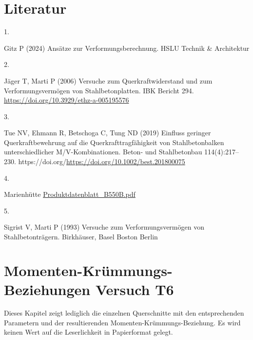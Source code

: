 \documentclass[
  11pt,
  letterpaper,
]{scrreprt}
\newlength{\cslhangindent}
\newlength{\csllabelwidth}
\newenvironment{CSLReferences}[2] %
 {\begin{list}{}{%
  \setlength{\itemindent}{0pt}
  \setlength{\leftmargin}{0pt}
  \setlength{\parsep}{0pt}
  \ifodd #1
   \setlength{\leftmargin}{\cslhangindent}
   \setlength{\itemindent}{-1\cslhangindent}
  \fi
  \setlength{\itemsep}{#2\baselineskip}}}
 {\end{list}}
\newcommand{\CSLLeftMargin}[1]{\parbox[t]{\csllabelwidth}{\strut#1\strut}}
\newcommand{\CSLRightInline}[1]{\parbox[t]{\linewidth - \csllabelwidth}{\strut#1\strut}}
\begin{document}
\chapter*{Literatur}\label{literatur}


\label{refs}
\begin{CSLReferences}{0}{1}
\CSLLeftMargin{1. }%
\CSLRightInline{Gitz P (2024) Ansätze zur {Verformungsberechnung}. HSLU
Technik \& Architektur}

\CSLLeftMargin{2. }%
\CSLRightInline{Jäger T, Marti P (2006) Versuche zum
{Querkraftwiderstand} und zum {Verformungsvermögen} von
{Stahlbetonplatten}. IBK Bericht 294.
\url{https://doi.org/10.3929/ethz-a-005195576}}

\CSLLeftMargin{3. }%
\CSLRightInline{Tue NV, Ehmann R, Betschoga C, Tung ND (2019) Einfluss
geringer {Querkraftbewehrung} auf die {Querkrafttragfähigkeit} von
{Stahlbetonbalken} unterschiedlicher {M}/{V}-{Kombinationen}. Beton- und
Stahlbetonbau 114(4):217--230.
https://doi.org/\url{https://doi.org/10.1002/best.201800075}}

\CSLLeftMargin{4. }%
\CSLRightInline{Marienhütte
\href{https://www.marienhuette.at/wp-content/uploads/Produktdatenblatt-B550B.pdf}{Produktdatenblatt\_B550B.pdf}}

\CSLLeftMargin{5. }%
\CSLRightInline{Sigrist V, Marti P (1993) Versuche zum
{Verformungsvermögen} von {Stahlbetonträgern}. Birkhäuser, Basel Boston
Berlin}

\end{CSLReferences}

\cleardoublepage
{}
{}
\appendix

\chapter{Momenten-Krümmungs-Beziehungen Versuch
T6}\label{momenten-kruxfcmmungs-beziehungen-versuch-t6}

Dieses Kapitel zeigt lediglich die einzelnen Querschnitte mit den
entsprechenden Parametern und der resultierenden
Momenten-Krümmungs-Beziehung. Es wird keinen Wert auf die Leserlichkeit
in Papierformat gelegt.
\end{document}
